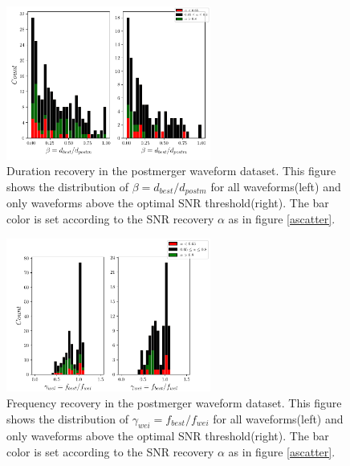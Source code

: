 \begin{figure}[hbt!]
\begin{center}
\includegraphics[width=0.6\textwidth, angle=0]{images/Data_analysis/results/alpha_betahist.pdf}
\captionsetup{width=0.8\textwidth}
\caption[Duration recovery in the postmerger waveform dataset]{Duration recovery in the postmerger waveform dataset. This figure shows the distribution of $\beta=d_{best}/d_{postm}$ for all waveforms(left) and only waveforms above the optimal SNR threshold(right). The bar color is set according to the SNR recovery $\alpha$ as in figure \ref{ascatter}.}
\label{abhist}
\end{center}
\end{figure}

\begin{figure}[hbt!]
\begin{center}
\includegraphics[width=0.6\textwidth, angle=0]{images/Data_analysis/results/alpha_gammahist.pdf}
\captionsetup{width=0.8\textwidth}
\caption[Frequency recovery in the postmerger waveform dataset]{Frequency recovery in the postmerger waveform dataset. This figure shows the distribution of $\gamma_{wei}=f_{best}/f_{wei}$ for all waveforms(left) and only waveforms above the optimal SNR threshold(right). The bar color is set according to the SNR recovery $\alpha$ as in figure \ref{ascatter}.}
\label{aghist}
\end{center}
\end{figure}
\FloatBarrier

